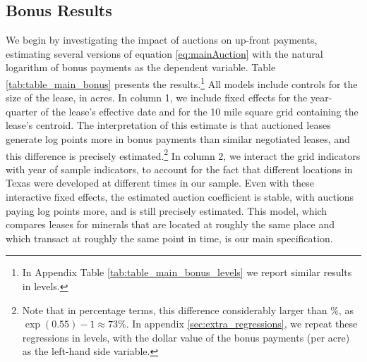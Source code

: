 \subsection{Bonus Results \label{subsec:ResultsLeaseBonus}}
We begin by investigating the impact of auctions on up-front payments, estimating several versions of equation \ref{eq:mainAuction} with the natural logarithm of bonus payments as the dependent variable. Table \ref{tab:table_main_bonus} presents the results.\footnote{In Appendix Table \ref{tab:table_main_bonus_levels} we report similar results in levels.} All models include controls for the size of the lease, in acres. In column 1, we include fixed effects for the year-quarter of the lease's effective date and for the 10 mile square grid containing the lease's centroid. The interpretation of this estimate is that auctioned leases generate  log points more in bonus payments than similar negotiated leases, and this difference is precisely estimated.\footnote{Note that in percentage terms, this difference considerably larger than \%, as $\exp(0.55) - 1 \approx 73\%$. In appendix \ref{sec:extra_regressions}, we repeat these regressions in levels, with the dollar value of the bonus payments (per acre) as the left-hand side variable.}  In column 2, we interact the grid indicators with year of sample indicators, to account for the fact that different locations in Texas were developed at different times in our sample. Even with these interactive fixed effects, the estimated auction coefficient is stable, with auctions paying  log points more, and is still precisely estimated. This model, which compares leases for minerals that are located at roughly the same place and which transact at roughly the same point in time, is our main specification. 

